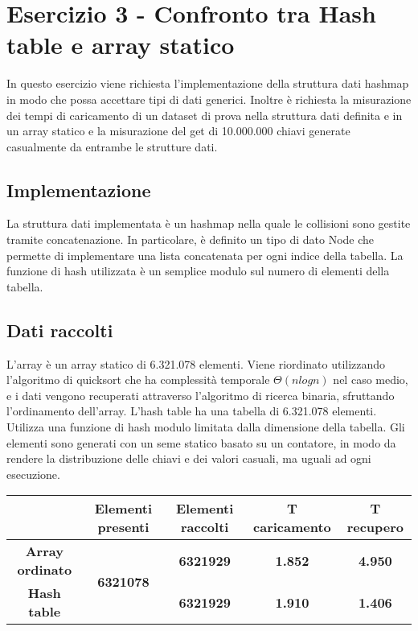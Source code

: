 \section{Esercizio 3 - Confronto tra Hash table e array statico }
In questo esercizio viene richiesta l'implementazione della struttura dati hashmap in modo che possa accettare tipi di dati generici. \newline Inoltre è richiesta la misurazione dei tempi di caricamento di un dataset di prova nella struttura dati definita e in un array statico e la misurazione del get di 10.000.000 chiavi generate casualmente da entrambe le strutture dati.
\subsection{Implementazione}
La struttura dati implementata è un hashmap nella quale le collisioni sono gestite tramite concatenazione. In particolare, è definito un tipo di dato Node che permette di implementare una lista concatenata per ogni indice della tabella. La funzione di hash utilizzata è un semplice modulo sul numero di elementi della tabella.

\subsection{Dati raccolti}
L'array è un array statico di 6.321.078 elementi. Viene riordinato utilizzando l'algoritmo di quicksort che ha complessità temporale $\Theta(nlogn)$ nel caso medio, e i dati vengono recuperati attraverso l'algoritmo di ricerca binaria, sfruttando l'ordinamento dell'array.\newline\newline
L'hash table ha una tabella di 6.321.078 elementi. Utilizza una funzione di hash modulo limitata dalla dimensione della tabella.\newline
Gli elementi sono generati con un seme statico basato su un contatore, in modo da rendere la distribuzione delle chiavi e dei valori casuali, ma uguali ad ogni esecuzione.
\begin{table}[h]
\centering
\begin{tabular}{|c|c|c|c|c|}
\hline
\textbf{}               & \textbf{Elementi presenti}        & \textbf{Elementi raccolti} & \textbf{T caricamento} & \textbf{T recupero} \\ \hline
\textbf{Array ordinato} & \multirow{2}{*}{\textbf{6321078}} & \textbf{6321929}                  & \textbf{1.852}                & \textbf{4.950}             \\ \cline{1-1} \cline{3-5} 
\textbf{Hash table}     &                                   & \textbf{6321929}                  & \textbf{1.910}                & \textbf{1.406}             \\ \hline
\end{tabular}
\end{table}
